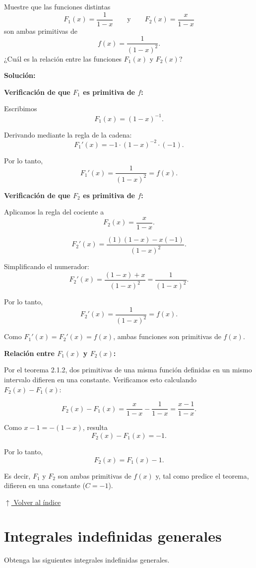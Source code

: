 \documentclass[12pt]{article}
\newcommand{\solucion}{%
    \vspace{0.8em}%
    \textbf{Solución:}%
}
\newcommand{\volverindice}{%
    \vspace{1em}%
    \begin{flushright}%
        \hyperlink{indice}{\small $\uparrow$ Volver al índice}%
    \end{flushright}%
}
\begin{document}
Muestre que las funciones distintas
\[
F_1(x)=\frac{1}{1-x}
\qquad\text{y}\qquad
F_2(x)=\frac{x}{1-x}
\]
son ambas primitivas de
\[
f(x)=\frac{1}{(1-x)^2}.
\]
¿Cuál es la relación entre las funciones $F_1(x)$ y $F_2(x)$?

\solucion

\textbf{Verificación de que $F_1$ es primitiva de $f$:}

Escribimos
\[
F_1(x)=(1-x)^{-1}.
\]

Derivando mediante la regla de la cadena:
\[
F_1'(x)=-1\cdot(1-x)^{-2}\cdot(-1).
\]

Por lo tanto,
\[
\boxed{
F_1'(x)=\frac{1}{(1-x)^2}=f(x)
}.
\]

\textbf{Verificación de que $F_2$ es primitiva de $f$:}

Aplicamos la regla del cociente a
\[
F_2(x)=\frac{x}{1-x}.
\]

\[
F_2'(x)
=
\frac{(1)(1-x)-x(-1)}{(1-x)^2}.
\]

Simplificando el numerador:
\[
F_2'(x)
=
\frac{(1-x)+x}{(1-x)^2}
=
\frac{1}{(1-x)^2}.
\]

Por lo tanto,
\[
\boxed{
F_2'(x)=\frac{1}{(1-x)^2}=f(x)
}.
\]

Como $F_1'(x)=F_2'(x)=f(x)$, ambas funciones son primitivas de $f(x)$.

\textbf{Relación entre $F_1(x)$ y $F_2(x)$:}

Por el teorema 2.1.2, dos primitivas de una misma función definidas en
un mismo intervalo difieren en una constante. Verificamos esto
calculando $F_2(x)-F_1(x)$:

\[
F_2(x)-F_1(x)
=
\frac{x}{1-x}-\frac{1}{1-x}
=
\frac{x-1}{1-x}.
\]

Como $x-1=-(1-x)$, resulta
\[
F_2(x)-F_1(x)=-1.
\]

Por lo tanto,
\[
\boxed{
F_2(x)=F_1(x)-1
}.
\]

Es decir, $F_1$ y $F_2$ son ambas primitivas de $f(x)$ y, tal como
predice el teorema, difieren en una constante ($C=-1$).

\volverindice
\newpage


\section{Integrales indefinidas generales}

Obtenga las siguientes integrales indefinidas generales.
\end{document}
